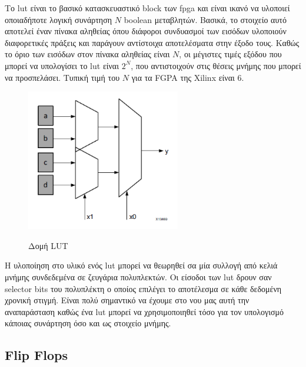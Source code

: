 Το \gls{lut} είναι το βασικό κατασκευαστικό block των \gls{fpga} και είναι ικανό να υλοποιεί οποιαδήποτε λογική συνάρτηση $N$ boolean μεταβλητών. Βασικά, το στοιχείο αυτό αποτελεί έναν πίνακα αληθείας όπου διάφοροι συνδυασμοί των εισόδων υλοποιούν διαφορετικές πράξεις και παράγουν αντίστοιχα αποτελέσματα στην έξοδο τους. Καθώς το όριο των εισόδων στον πίνακα αληθείας είναι $N$, οι μέγιστες τιμές εξόδου που μπορεί να υπολογίσει το \gls{lut} είναι $2^N$, που αντιστοιχούν στις θέσεις μνήμης που μπορεί να προσπελάσει. Τυπική τιμή του $N$ για τα FGPA της Xilinx είναι 6.
\begin{figure}[H]
  	\centering
	\includegraphics[width=0.6\textwidth]{images/lut}\\
	\caption{Δομή LUT \cite{lut}}
\end{figure}

Η υλοποίηση στο υλικό ενός \gls{lut} μπορεί να θεωρηθεί σα μία συλλογή από κελιά μνήμης συνδεδεμένα σε ζευγάρια πολυπλεκτών. Οι είσοδοι των \gls{lut} δρουν σαν selector bits του πολυπλέκτη ο οποίος επιλέγει το αποτέλεσμα σε κάθε δεδομένη χρονική στιγμή. Είναι πολύ σημαντικό να έχουμε στο νου μας αυτή την αναπαράσταση καθώς ένα \gls{lut} μπορεί να χρησιμοποιηθεί τόσο για τον υπολογισμό κάποιας συνάρτηση όσο και ως στοιχείο μνήμης.
\subsection{Flip Flops}

